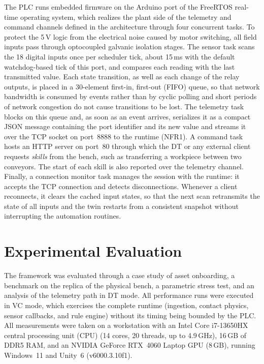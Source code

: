 \documentclass{ieeeojies}
\begin{document}
The PLC runs embedded firmware on the Arduino port of the FreeRTOS real-time operating system, which realizes the plant side of the telemetry and command channels defined in the architecture through four concurrent tasks. To protect the 5\,V logic from the electrical noise caused by motor switching, all field inputs pass through optocoupled galvanic isolation stages. The sensor task scans the 18 digital inputs once per scheduler tick, about 15\,ms with the default watchdog-based tick of this port, and compares each reading with the last transmitted value. Each state transition, as well as each change of the relay outputs, is placed in a 30-element first-in, first-out (FIFO) queue, so that network bandwidth is consumed by events rather than by cyclic polling and short periods of network congestion do not cause transitions to be lost. The telemetry task blocks on this queue and, as soon as an event arrives, serializes it as a compact JSON message containing the port identifier and its new value and streams it over the TCP socket on port~8888 to the runtime (NFR1). A command task hosts an HTTP server on port~80 through which the DT or any external client requests \textit{skills} from the bench, such as transferring a workpiece between two conveyors. The start of each skill is also reported over the telemetry channel. Finally, a connection monitor task manages the session with the runtime: it accepts the TCP connection and detects disconnections. Whenever a client reconnects, it clears the cached input states, so that the next scan retransmits the state of all inputs and the twin restarts from a consistent snapshot without interrupting the automation routines.

\section{Experimental Evaluation}
\label{sec:results}

The framework was evaluated through a case study of asset onboarding, a benchmark on the replica of the physical bench, a parametric stress test, and an analysis of the telemetry path in DT mode. All performance runs were executed in VC mode, which exercises the complete runtime (ingestion, contact physics, sensor callbacks, and rule engine) without its timing being bounded by the PLC. All measurements were taken on a workstation with an Intel Core i7-13650HX central processing unit (CPU) (14 cores, 20 threads, up to 4.9\,GHz), 16\,GB of DDR5 RAM, and an NVIDIA GeForce RTX~4060 Laptop GPU (8\,GB), running Windows~11 and Unity~6 (v6000.3.10f1).
\end{document}

